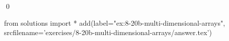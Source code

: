 
\begin{ex} 
  \label{ex:8-20b-multi-dimensional-arrays}
  
  \qed
\end{ex} 
\begin{python0}
from solutions import *
add(label="ex:8-20b-multi-dimensional-arrays",
    srcfilename='exercises/8-20b-multi-dimensional-arrays/answer.tex') 
\end{python0}

